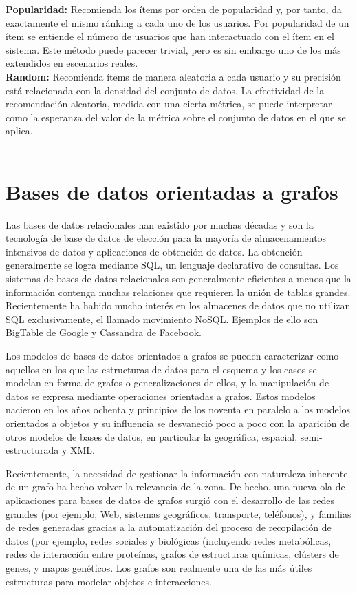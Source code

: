 		\textbf{Popularidad:} Recomienda los ítems por orden de popularidad y, por tanto, da exactamente el mismo ránking a cada uno de los usuarios. Por popularidad de un ítem se entiende el número de usuarios que han interactuado con el ítem en el sistema. Este método puede parecer trivial, pero es sin embargo uno de los más extendidos en escenarios reales.\\
		\newpage
		\textbf{Random:} Recomienda ítems de manera aleatoria a cada usuario y su precisión está relacionada con la densidad del conjunto de datos. La efectividad de la recomendación aleatoria, medida con una cierta métrica, se puede interpretar como la esperanza del valor de la métrica sobre el conjunto de datos en el que se aplica. \cite{11}\\\\

 \section{Bases de datos orientadas a grafos}
	Las bases de datos relacionales han existido por muchas décadas y son la tecnología de base de datos de elección para la mayoría de almacenamientos intensivos de datos y aplicaciones de obtención de datos. La obtención generalmente se logra mediante SQL, un lenguaje declarativo de consultas. Los sistemas de bases de datos relacionales son generalmente eficientes a menos que la información contenga muchas relaciones que requieren la unión de tablas grandes. Recientemente ha habido mucho interés en los almacenes de datos que no utilizan SQL exclusivamente, el llamado movimiento NoSQL. Ejemplos de ello son BigTable de Google y Cassandra de Facebook. \cite{7}

	Los modelos de bases de datos orientados a grafos se pueden caracterizar como aquellos en los que las estructuras de datos para el esquema y los casos se modelan en forma de grafos o generalizaciones de ellos, y la manipulación de datos se expresa mediante operaciones orientadas a grafos. Estos modelos nacieron en los años ochenta y principios de los noventa en paralelo a los modelos orientados a objetos y su influencia se desvaneció poco a poco con la aparición de otros modelos de bases de datos, en particular la geográfica, espacial, semi-estructurada y XML.

	Recientemente, la necesidad de gestionar la información con naturaleza inherente de un grafo ha hecho volver la relevancia de la zona. De hecho, una nueva ola de aplicaciones para bases de datos de grafos surgió con el desarrollo de las redes grandes (por ejemplo, Web, sistemas geográficos, transporte, teléfonos), y familias de redes generadas gracias a la automatización del proceso de recopilación de datos (por ejemplo, redes sociales y biológicas (incluyendo redes metabólicas, redes de interacción entre proteínas, grafos de estructuras químicas, clústers de genes, y mapas genéticos. Los grafos son realmente una de las más útiles estructuras para modelar objetos e interacciones.\cite{8}

